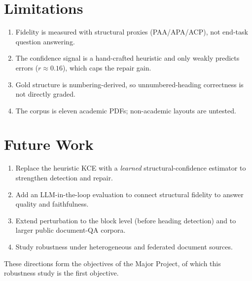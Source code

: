 \documentclass[12pt,a4paper]{report}
\begin{document}
\section{Limitations}
\begin{enumerate}\setlength{\itemsep}{1pt}
  \item Fidelity is measured with structural proxies (PAA/APA/ACP), not end-task question answering.
  \item The confidence signal is a hand-crafted heuristic and only weakly predicts errors ($r\approx0.16$), which caps the repair gain.
  \item Gold structure is numbering-derived, so unnumbered-heading correctness is not directly graded.
  \item The corpus is eleven academic PDFs; non-academic layouts are untested.
\end{enumerate}

\section{Future Work}
\begin{enumerate}\setlength{\itemsep}{1pt}
  \item Replace the heuristic KCE with a \emph{learned} structural-confidence estimator to strengthen detection and repair.
  \item Add an LLM-in-the-loop evaluation to connect structural fidelity to answer quality and faithfulness.
  \item Extend perturbation to the block level (before heading detection) and to larger public document-QA corpora.
  \item Study robustness under heterogeneous and federated document sources.
\end{enumerate}
These directions form the objectives of the Major Project, of which this robustness study is the
first objective.
\end{document}

